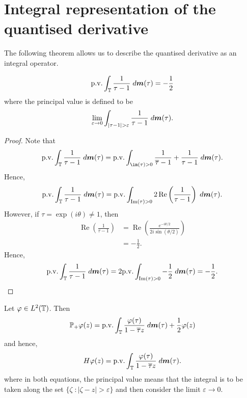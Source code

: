 \documentclass{unswmaths}
\begin{document}
\section*{Integral representation of the quantised derivative}
The following theorem allows us to describe the quantised derivative as an integral operator.
\begin{lemma}
\label{singularIntegral}
    \begin{equation*}
        \mathrm{p.v.}\int_{\mathbb{T}} \frac{1}{\tau-1}\;d\boldsymbol{m}(\tau) = -\frac{1}{2}
    \end{equation*}
    where the principal value is defined to be
    \begin{equation*}
        \lim_{\varepsilon\rightarrow 0} \int_{|\tau-1|>\varepsilon} \frac{1}{\tau-1}\;d\ha(\tau).
    \end{equation*}
\end{lemma} 
\begin{proof}
    Note that
    \begin{equation*}
        \pvint_\Circ \frac{1}{\tau-1}\;d\ha(\tau) = \pvint_{\im(\tau) > 0} \frac{1}{\overline{\tau}-1}+\frac{1}{\tau-1}\;d\ha(\tau).
    \end{equation*}
    Hence,
    \begin{equation*}
        \mathrm{p.v.}\int_{\mathbb{T}} \frac{1}{\tau-1}\;d\boldsymbol{m}(\tau) = \mathrm{p.v.}\int_{\operatorname{Im}(\tau)>0} 2\operatorname{Re}\left(\frac{1}{\tau-1}\right)\;d\boldsymbol{m}(\tau).
    \end{equation*}
    However, if $\tau = \exp(i\theta) \neq 1$, then
    \begin{align*}
        \operatorname{Re}\left(\frac{1}{\tau-1}\right) &= \operatorname{Re}\left(\frac{e^{-i\theta/2}}{2i\sin(\theta/2)}\right)\\
        &= -\frac{1}{2}.
    \end{align*}
    Hence,
    \begin{equation*}
        \mathrm{p.v.}\int_{\mathbb{T}} \frac{1}{\tau-1}\;d\boldsymbol{m}(\tau) = 2\mathrm{p.v.}\int_{\operatorname{Im}(\tau)>0} -\frac{1}{2}\;d\boldsymbol{m}(\tau) = -\frac{1}{2}.
    \end{equation*}
\end{proof}
\begin{theorem}
    Let $\varphi \in L^2(\mathbb{T})$. Then
    \begin{equation*}
        \mathbb{P}_+\varphi(z) = \mathrm{p.v.}\int_{\mathbb{T}} \frac{\varphi(\tau)}{1-\overline{\tau}z}\;d\boldsymbol{m}(\tau)+\frac{1}{2}\varphi(z)
    \end{equation*}
    and hence,
    \begin{equation*}
        H\varphi(z) = \mathrm{p.v.}\int_{\mathbb{T}} \frac{\varphi(\tau)}{1-\overline{\tau}z}\;d\boldsymbol{m}(\tau).
    \end{equation*}
    where in both equations, the principal value means that the integral is to be taken along the set $\{ \zeta\;:|\zeta-z| > \varepsilon\}$
    and then consider the limit $\varepsilon\rightarrow 0$.
\end{theorem}
\end{document}
